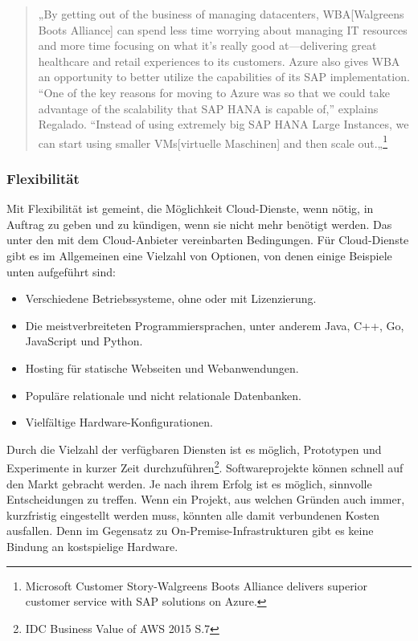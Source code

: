 \begin{quote}
      „By getting out of the business of managing datacenters, WBA[Walgreens Boots Alliance] can spend less time worrying about managing IT resources and more time focusing on what it’s really good at—delivering great healthcare and retail experiences to its customers. Azure also gives WBA an opportunity to better utilize the capabilities of its SAP implementation. “One of the key reasons for moving to Azure was so that we could take advantage of the scalability that SAP HANA is capable of,” explains Regalado. “Instead of using extremely big SAP HANA Large Instances, we can start using smaller VMs[virtuelle Maschinen] and then scale out.„\footnote{Microsoft Customer Story-Walgreens Boots Alliance delivers superior customer service with SAP solutions on Azure.\cite{AZU01}}
\end{quote}

\subsubsection{Flexibilität}%
Mit Flexibilität ist gemeint, die Möglichkeit Cloud-Dienste, wenn nötig, in Auftrag zu geben und zu kündigen, wenn sie nicht mehr benötigt werden. Das unter den mit dem Cloud-Anbieter vereinbarten Bedingungen.
Für Cloud-Dienste gibt es im Allgemeinen eine Vielzahl von Optionen, von denen einige Beispiele unten aufgeführt sind:
\begin{itemize}
\item
    Verschiedene Betriebssysteme, ohne oder mit Lizenzierung.
\item
    Die meistverbreiteten Programmiersprachen, unter anderem Java, C++, Go, JavaScript und Python.{\cite{AMZ03}}
\item
    Hosting für statische Webseiten und Webanwendungen{\cite{AMZ04}}.
\item
    Populäre relationale und nicht relationale Datenbanken{\cite{AMZ10}}.           
\item
    Vielfältige Hardware-Konfigurationen.

\end{itemize}
\begin{flushleft}
Durch die Vielzahl der verfügbaren Diensten ist es möglich, Prototypen und Experimente in kurzer Zeit durchzuführen\footnote{IDC Business Value of AWS 2015 S.7\cite{IDC01}}. Softwareprojekte können schnell auf den Markt gebracht werden. Je nach ihrem Erfolg ist es möglich, sinnvolle Entscheidungen zu treffen. Wenn ein Projekt, aus welchen Gründen auch immer, kurzfristig eingestellt werden muss, könnten alle damit verbundenen Kosten ausfallen. Denn im Gegensatz zu On-Premise-Infrastrukturen gibt es keine Bindung an kostspielige Hardware.
\end{flushleft}

